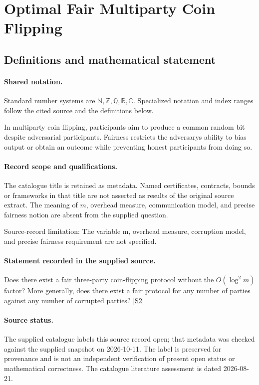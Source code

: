 \documentclass[11pt]{article}
\newcommand{\sref}[2]{\hyperlink{source:#1:#2}{[S#2]}}
\begin{document}
\section{Optimal Fair Multiparty Coin Flipping}\label{statement}

\subsection{Definitions and mathematical statement}

\paragraph{Shared notation.}Standard number systems are $\mathbb N,\mathbb Z,\mathbb Q,\mathbb R,\mathbb C$. Specialized notation and index ranges follow the cited source and the definitions below.


In multiparty coin flipping, participants aim to produce a common random bit despite adversarial participants. Fairness restricts the adversary\textquotesingle s ability to bias output or obtain an outcome while preventing honest participants from doing so.
\paragraph{Record scope and qualifications.}
The catalogue title is retained as metadata. Named certificates, contracts, bounds or frameworks in that title are not asserted as results of the original source extract.
The meaning of $m$, overhead measure, communication model, and precise fairness notion are absent from the supplied question.

Source-record limitation: The variable m, overhead measure, corruption model, and precise fairness requirement are not specified.
\paragraph{Statement recorded in the supplied source.}
Does there exist a fair three-party coin-flipping protocol without the $O(\log^2 m)$ factor? More generally, does there exist a fair protocol for any number of parties against any number of corrupted parties? \sref{statement}{2}
\paragraph{Source status.}
The supplied catalogue labels this source record open; that metadata was checked against the supplied snapshot on 2026-10-11. The label is preserved for provenance and is not an independent verification of present open status or mathematical correctness. The catalogue literature assessment is dated 2026-08-21.
\end{document}
